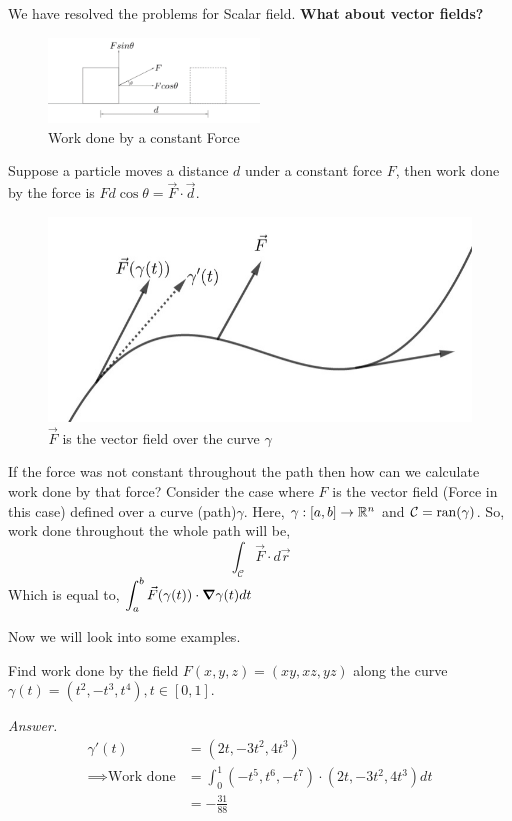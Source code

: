 \documentclass[../Analysis-3.tex]{subfiles}
\begin{document}
We have resolved the problems for Scalar field. \textbf{What about vector fields?}
\begin{figure}[H]
  \centering
  \includegraphics[width=0.5\textwidth]{../figures/lec-23.2.png}
  \caption{Work done by a constant Force}
\end{figure}
Suppose a particle moves a distance $d$ under a constant force $F$, then work done by the force is $Fd\cos{\theta} = \vec{F}\cdot\vec{d}$.


\begin{figure}
  \centering
  \includegraphics[width=.98\linewidth]{../figures/lec-23.3.png}
  \caption{$\vec{F}$ is the vector field over the curve $\gamma$}
\end{figure}

If the force was not constant throughout the path then how can we calculate work done by that force?
Consider the case where $F$ is the vector field (Force in this case) defined over a curve (path)$\gamma$. Here, $\gamma : [a,b] \to \mathbb{R}^n$ and $\mathcal{C} = \operatorname{ran}(\gamma)$. So, work done throughout the whole path will be,
\[\int_{\mathcal{C}} \vec{F}\cdot d\vec{r}\]
Which is equal to, $\displaystyle\int_a^b \vec{F}(\gamma(t))\cdot \grad \gamma(t) dt$

Now we will look into some examples.
\vspace{0.3cm}

\begin{Eg}{}{}
  Find work done by the field $F(x,y,z) = (xy,xz,yz)$ along the curve $\gamma(t) = (t^2,-t^3,t^4),t \in [0,1]$.

  \textit{Answer.} \begin{align*}
    \gamma'(t)
                              & = (2t,-3t^2,4t^3)                                 \\
    \implies \text{Work done} & = \int_0^1 (-t^5,t^6,-t^7)\cdot(2t,-3t^2,4t^3) dt \\
                              & = -\frac{31}{88}
  \end{align*}
\end{Eg}
\end{document}
